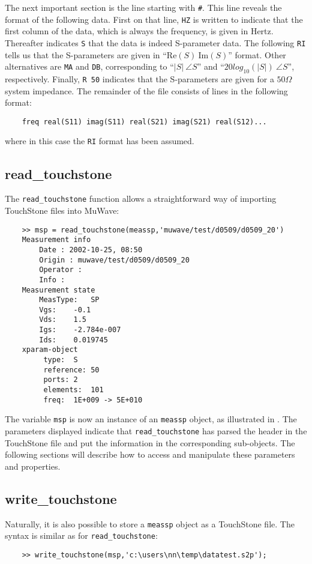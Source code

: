 The next important section is the line starting with \verb"#".
This line reveals the format of the following data. First on that
line, \verb"HZ" is written to indicate that the first column of
the data, which is always the frequency, is given in Hertz.
Thereafter indicates \verb"S" that the data is indeed S-parameter
data. The following \verb"RI" tells us that the S-parameters are
given in ``$\mathrm{Re}(S)~\mathrm{Im}(S)$'' format. Other
alternatives are \verb"MA" and \verb"DB", corresponding to
``$|S|~\angle S$'' and ``$20 log_{10}(|S|)~\angle S$'',
respectively. Finally, \verb"R 50" indicates that the S-parameters
are given for a $50 \Omega$ system impedance. The remainder of the
file consists of lines in the following format:
\begin{small}
\begin{verbatim}
    freq real(S11) imag(S11) real(S21) imag(S21) real(S12)...
\end{verbatim}
\end{small}
where in this case the \verb"RI" format has been assumed.

\subsection{read\_touchstone}
The \verb"read_touchstone" function allows a straightforward way
of importing TouchStone files into MuWave:

\begin{small}
\begin{verbatim}
    >> msp = read_touchstone(meassp,'muwave/test/d0509/d0509_20')
    Measurement info
        Date : 2002-10-25, 08:50
        Origin : muwave/test/d0509/d0509_20
        Operator :
        Info :
    Measurement state
    	MeasType:	SP
    	Vgs:	-0.1
    	Vds:	1.5
    	Igs:	-2.784e-007
    	Ids:	0.019745
    xparam-object
    	 type:	S
    	 reference:	50
    	 ports:	2
    	 elements:	101
    	 freq:	1E+009 -> 5E+010
\end{verbatim}
\end{small}

The variable \verb"msp" is now an instance of an \verb"meassp"
object, as illustrated in . The parameters
displayed indicate that \verb"read_touchstone" has parsed the
header in the TouchStone file and put the information in the
corresponding sub-objects. The following sections will describe
how to access and manipulate these parameters and properties.

\subsection{write\_touchstone}
Naturally, it is also possible to store a \verb"meassp" object as
a TouchStone file. The syntax is similar as for
\verb"read_touchstone":
\begin{small}
\begin{verbatim}
    >> write_touchstone(msp,'c:\users\nn\temp\datatest.s2p');
\end{verbatim}
\end{small}
